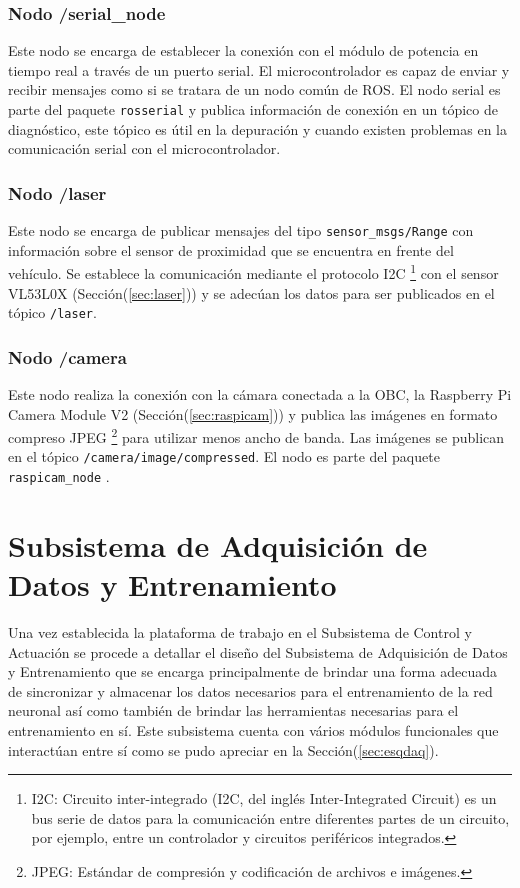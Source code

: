     \subsubsection{Nodo /serial\_node}
    Este nodo se encarga de establecer la conexión con el módulo de potencia en tiempo real a través de un puerto serial. El 
    microcontrolador es capaz de enviar y recibir mensajes como si se tratara de un nodo común de ROS. El nodo serial es parte 
    del paquete \lstinline{rosserial}\cite{ferguson} y publica información de conexión en un tópico de diagnóstico, este tópico es 
    útil en la depuración y cuando existen problemas en la comunicación serial con el microcontrolador.

    \subsubsection{Nodo /laser}
    Este nodo se encarga de publicar mensajes del tipo \lstinline{sensor_msgs/Range} con información sobre el sensor de proximidad 
    que se encuentra en frente del vehículo. Se establece la comunicación mediante el protocolo I2C \footnote{I2C: Circuito inter-integrado (I2C, del inglés Inter-Integrated Circuit) es un bus serie de datos para la comunicación entre diferentes partes de un circuito, por ejemplo, entre un controlador y circuitos periféricos integrados.}
    con el sensor VL53L0X (Sección(\ref{sec:laser})) y se adecúan los datos para ser publicados en el tópico \lstinline{/laser}.

    \subsubsection{Nodo /camera}
    Este nodo realiza la conexión con la cámara conectada a la OBC, la Raspberry Pi Camera Module V2 (Sección(\ref{sec:raspicam})) 
    y publica las imágenes en formato compreso JPEG \footnote{JPEG: Estándar de compresión y codificación de archivos e imágenes.}
    para utilizar menos ancho de banda. Las imágenes se publican en el tópico \lstinline{/camera/image/compressed}. El nodo 
    es parte del paquete \lstinline{raspicam_node} \cite{agrawalgramlich2018}.


\section{Subsistema de Adquisición de Datos y Entrenamiento}\label{sec:daq}

Una vez establecida la plataforma de trabajo en el Subsistema de Control y Actuación se procede a detallar el diseño del 
Subsistema de Adquisición de Datos y Entrenamiento que se encarga principalmente de brindar una forma adecuada de sincronizar 
y almacenar los datos necesarios para el entrenamiento de la red neuronal así como también de brindar las herramientas necesarias 
para el entrenamiento en sí. Este subsistema cuenta con vários módulos funcionales que interactúan entre sí como se pudo apreciar 
en la Sección(\ref{sec:esqdaq}). 

